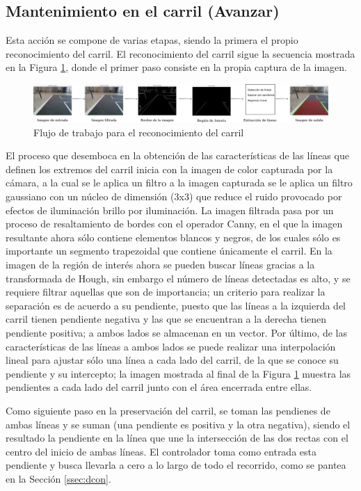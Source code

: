 \subsection{Mantenimiento en el carril (Avanzar)}
\label{ssec:ava}
Esta acción se compone de varias etapas, siendo la primera el propio reconocimiento del carril. El reconocimiento del carril sigue la secuencia mostrada en la Figura \ref{fig:pipe}, donde el primer paso consiste en la propia captura de la imagen.
\begin{figure}[htbp!]
	\centering
	\includegraphics[width=\textwidth]{./Figuras/Pipe}
	\caption{Flujo de trabajo para el reconocimiento del carril}
	\label{fig:pipe}
\end{figure}
\par El proceso que desemboca en la obtención de las características de las líneas que definen los extremos del carril inicia con la imagen de color capturada por la cámara, a la cual se le aplica un filtro a la imagen capturada se le aplica un filtro gaussiano con un núcleo de dimensión (3x3) que reduce el ruido provocado por efectos de iluminación brillo por iluminación. La imagen filtrada pasa por un proceso de resaltamiento de bordes con el operador Canny, en el que la imagen resultante ahora sólo contiene elementos blancos y negros, de los cuales sólo es importante un segmento trapezoidal que contiene únicamente el carril. En la imagen de la región de interés ahora se pueden buscar líneas gracias a la transformada de Hough, sin embargo el número de líneas detectadas es alto, y se requiere  filtrar aquellas que son de importancia; un criterio para realizar la separación es de acuerdo a su pendiente, puesto que las líneas a la izquierda del carril tienen pendiente negativa y las que se encuentran a la derecha tienen pendiente positiva; a ambos lados se almacenan en un vector. Por último, de las características de las líneas a ambos lados se puede realizar una interpolación lineal para ajustar sólo una línea a cada lado del carril, de la que se conoce su pendiente y su intercepto; la imagen mostrada al final de la Figura \ref{fig:pipe} muestra las pendientes a cada lado del carril junto con el área encerrada entre ellas.
\par Como siguiente paso en la preservación del carril, se toman las pendienes de ambas líneas y se suman (una pendiente es positiva y la otra negativa), siendo el resultado la pendiente en la línea que une la intersección de las dos rectas con el centro del inicio de ambas líneas. El controlador toma como entrada esta pendiente y busca llevarla a cero a lo largo de todo el recorrido, como se pantea en la Sección \ref{ssec:dcon}.
